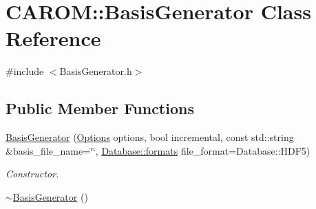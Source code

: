 \hypertarget{class_c_a_r_o_m_1_1_basis_generator}{\section{C\-A\-R\-O\-M\-:\-:Basis\-Generator Class Reference}
\label{class_c_a_r_o_m_1_1_basis_generator}
}


{\ttfamily \#include $<$Basis\-Generator.\-h$>$}

\subsection*{Public Member Functions}
\begin{DoxyCompactItemize}
\item 
\hyperlink{class_c_a_r_o_m_1_1_basis_generator_af8ab59fbf70df5759d42477a98acb129}{Basis\-Generator} (\hyperlink{class_c_a_r_o_m_1_1_options}{Options} options, bool incremental, const std\-::string \&basis\-\_\-file\-\_\-name=\char`\"{}\char`\"{}, \hyperlink{class_c_a_r_o_m_1_1_database_a8ab29ee6466ef8415ee0ef93d94cc5f7}{Database\-::formats} file\-\_\-format=Database\-::\-H\-D\-F5)
\begin{DoxyCompactList}\small\item\em Constructor. \end{DoxyCompactList}\item 
\hypertarget{class_c_a_r_o_m_1_1_basis_generator_aaff407525e946b643de371a46ab070aa}{\hyperlink{class_c_a_r_o_m_1_1_basis_generator_aaff407525e946b643de371a46ab070aa}{$\sim$\-Basis\-Generator} ()}\label{class_c_a_r_o_m_1_1_basis_generator_aaff407525e946b643de371a46ab070aa}


\end{DoxyCompactItemize}
